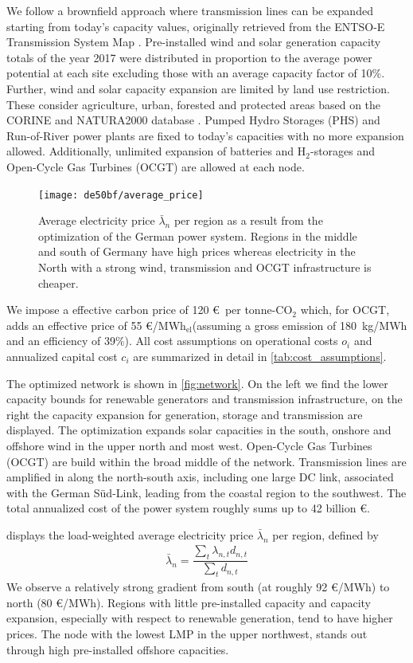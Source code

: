 \documentclass[11pt,twocolumn]{article}
\newcommand{\lmp}[1][n]{\lambda_{#1,t}}
\newcommand{\averagelmp}{\bar{\lambda}_n}
\newcommand{\demand}[1][n]{d_{#1,t}}
\newcommand{\megawatthour}{MWh$_\text{el}$}
\begin{document}
We follow a brownfield approach where transmission lines can be expanded starting from today's capacity values, originally retrieved from the ENTSO-E Transmission System Map \cite{entso-e_entso-e_nodate}. Pre-installed wind and solar generation capacity totals of the year 2017 were distributed in proportion to the average power potential at each site excluding those with an average capacity factor of 10\%. Further, wind and solar capacity expansion are limited by land use restriction. These consider agriculture, urban, forested and protected areas based on the CORINE and NATURA2000 database \cite{corine2012,natura2000}. Pumped Hydro Storages (PHS) and Run-of-River power plants are fixed to today's capacities with no more expansion allowed. Additionally, unlimited expansion of batteries and H$_{2}$-storages and Open-Cycle Gas Turbines (OCGT) are allowed at each node. 
% 
% 
\begin{figure}
    \centering
    \texttt{[image: de50bf/average\_price]}
    \caption{Average electricity price $\averagelmp$ per region as a result from the optimization of the German power system. Regions in the middle and south of Germany have high prices whereas electricity in the North with a strong wind, transmission and OCGT infrastructure is cheaper.}
    \label{fig:average_price}
\end{figure}
We impose a effective carbon price of 120 \euro\, per tonne-CO$_{2}$ which, for OCGT, adds an effective price of 55 \euro/\megawatthour (assuming a gross emission of 180~kg/MWh and an efficiency of 39\%). All cost assumptions on operational costs $o_i$ and annualized capital cost $c_i$ are summarized in detail in \cref{tab:cost_assumptions}. 

The optimized network is shown in  \cref{fig:network}. On the left we find the lower capacity bounds for renewable generators and transmission infrastructure, on the right the capacity expansion for generation, storage and transmission are displayed. The optimization expands solar capacities in the south, onshore and offshore wind in the upper north and most west. Open-Cycle Gas Turbines (OCGT) are build within the broad middle of the network. Transmission lines are amplified in along the north-south axis, including one large DC link, associated with the German S\"ud-Link, leading from the coastal region to the southwest. 
The total annualized cost of the power system roughly sums up to 42 billion \euro.
% 

 displays the load-weighted average electricity price $\averagelmp$ per region, defined by 
\begin{align}
    \averagelmp = \dfrac{\sum_{t} \lmp \demand}{\sum_t \demand}    
\end{align}
We observe a relatively strong gradient from south (at roughly 92 \euro/MWh) to north (80 \euro/MWh). Regions with little pre-installed capacity and capacity expansion, especially with respect to renewable generation, tend to have higher prices. The node with the lowest LMP in the upper northwest, stands out through high pre-installed offshore capacities. \\
 
\end{document}
